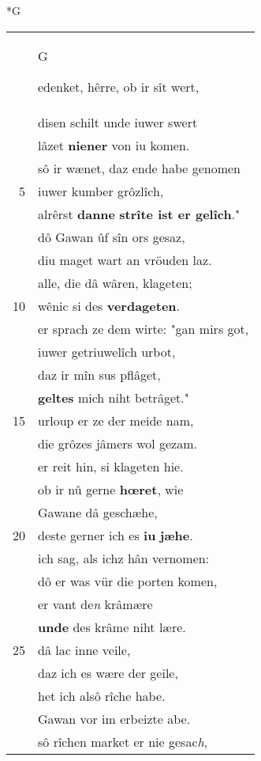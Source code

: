 \documentclass[8pt,a4paper,notitlepage]{article}
\begin{document}
\begin{table}[ht]
\begin{minipage}[t]{0.5\linewidth}
\small
\begin{center}*G
\end{center}
\begin{tabular}{rl}
 & \begin{large}G\end{large}edenket, hêrre, ob ir sît wert,\\ 
 & disen schilt unde iuwer swert\\ 
 & lâzet \textbf{niener} von iu komen.\\ 
 & sô ir wænet, daz ende habe genomen\\ 
5 & iuwer kumber grôzlîch,\\ 
 & alrêrst \textbf{danne} \textbf{strîte ist er gelîch}."\\ 
 & dô Gawan ûf sîn ors gesaz,\\ 
 & diu maget wart an vröuden laz.\\ 
 & alle, die dâ wâren, klageten;\\ 
10 & wênic si des \textbf{verdageten}.\\ 
 & er sprach ze dem wirte: "gan mirs got,\\ 
 & iuwer getriuwelîch urbot,\\ 
 & daz ir mîn sus pflâget,\\ 
 & \textbf{geltes} mich niht betrâget."\\ 
15 & urloup er ze der meide nam,\\ 
 & die grôzes jâmers wol gezam.\\ 
 & er reit hin, si klageten hie.\\ 
 & ob ir nû gerne \textbf{hœret}, wie\\ 
 & Gawane dâ geschæhe,\\ 
20 & deste gerner ich es \textbf{iu} \textbf{jæhe}.\\ 
 & ich sag, als ichz hân vernomen:\\ 
 & dô er was vür die porten komen,\\ 
 & er vant de\textit{n} krâmære\\ 
 & \textbf{unde} des krâme niht lære.\\ 
25 & dâ lac inne veile,\\ 
 & daz ich es wære der geile,\\ 
 & het ich alsô rîche habe.\\ 
 & Gawan vor im erbeizte abe.\\ 
 & sô rîchen market er nie gesac\textit{h},\\ 

\end{tabular}
\end{minipage}
\end{table}
\end{document}

